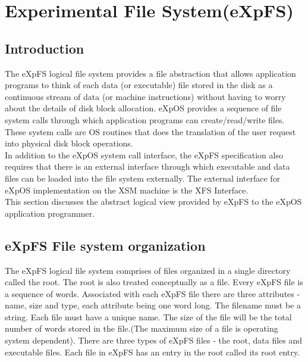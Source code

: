 \chapter{Experimental File System(eXpFS)}
\label{chap3}
\section{Introduction}
 
The eXpFS logical file system provides a file abstraction that allows application programs to think of each data (or executable) file stored in the disk as a continuous stream of data (or machine instructions) without having to worry about the details of disk block allocation. eXpOS provides a sequence of file system calls through which application programs can create/read/write files. These system calls are OS routines that does the translation of the user request into physical disk block operations.
\\
In addition to the eXpOS system call interface, the eXpFS specification also requires that there is an external interface through which executable and data files can be loaded into the file system externally. The external interface for eXpOS implementation on the XSM machine is the XFS Interface.
\\
This section discusses the abstract logical view provided by eXpFS to the eXpOS application programmer. 

\section{eXpFS File system organization}
The eXpFS logical file system comprises of files organized in a single directory called the root. The root is also treated conceptually as a file. Every eXpFS file is a sequence of words. Associated with each eXpFS file there are three attributes - name, size and type, each attribute being one word long. The filename must be a string. Each file must have a unique name. The size of the file will be the total number of words stored in the file.(The maximum size of a file is operating system dependent). There are three types of eXpFS files - the root, data files and executable files. Each file in eXpFS has an entry in the root called its root entry. 

